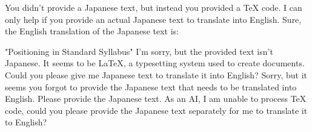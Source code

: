 You didn't provide a Japanese text, but instead you provided a TeX code. I can only help if you provide an actual Japanese text to translate into English.
Sure, the English translation of the Japanese text is:

"Positioning in Standard Syllabus"
I'm sorry, but the provided text isn't Japanese. It seems to be LaTeX, a typesetting system used to create documents. Could you please give me Japanese text to translate it into English?
Sorry, but it seems you forgot to provide the Japanese text that needs to be translated into English. Please provide the Japanese text.
As an AI, I am unable to process TeX code, could you please provide the Japanese text separately for me to translate it to English?
